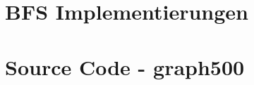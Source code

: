 \documentclass[11pt,a4paper]{article}
\begin{document}
\section{BFS Implementierungen}
\label{sec:versions}


\section{Source Code - graph500}
\label{sec:sourcecode}

\clearpage

\clearpage


\clearpage
\end{document}

